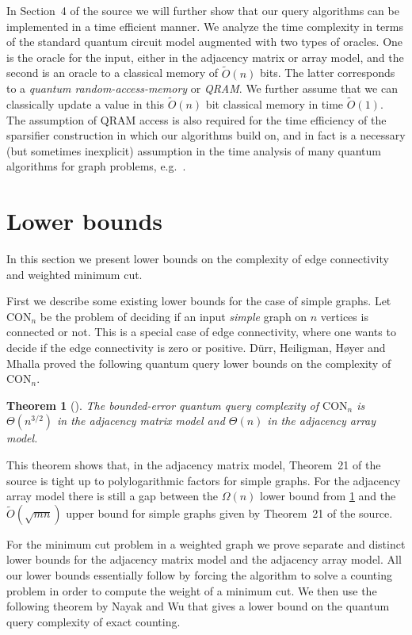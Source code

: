 \documentclass[10pt,a4paper]{article}
\newcommand{\CON}{\mathrm{CON}}
\newcommand{\tO}{\tilde O}
\newcommand{\1}{\mathbf{1}}
\newtheorem{theorem}{Theorem}
\theoremstyle{definition}
\begin{document}
In Section~4 of the source we will further show that our query algorithms can be implemented in a time efficient manner.  We analyze the time complexity in terms of the standard quantum circuit model augmented with two types of oracles.  
One is the oracle for the input, either in the adjacency matrix or array model, and the second is an oracle to a classical memory of $\tO(n)$ bits.  The latter corresponds to a \emph{quantum random-access-memory} or \emph{QRAM}.  We further assume that 
we can classically update a value in this $\tO(n)$ bit classical memory in time $\tO(1)$.  
The assumption of QRAM access is also required for the time efficiency of the sparsifier construction in \cite{AdW19} which our algorithms build on, and in fact is a necessary (but sometimes inexplicit) assumption in the time analysis of many quantum algorithms for graph problems, e.g.~\cite{DHHM06,Amb06,B13}.


\setcounter{section}{4}
\setcounter{theorem}{32}
\section{Lower bounds} \label{sec:lower-bounds}
In this section we present lower bounds on the complexity of edge connectivity and weighted minimum cut.

First we describe some existing lower bounds for the case of simple graphs.
Let $\CON_n$ be the problem of deciding if an input \emph{simple} graph on $n$ vertices is connected or not.  This is a special case of edge connectivity, where one wants 
to decide if the edge connectivity is zero or positive.  D\"{u}rr, Heiligman, H{\o}yer and Mhalla \cite{DHHM06} proved the following quantum query lower bounds on the complexity of $\CON_n$.
\begin{theorem}[\cite{DHHM06}]
\label{thm:durr_lower}
The bounded-error quantum query complexity of $\CON_n$ is $\Theta(n^{3/2})$ in the adjacency matrix model and 
$\Theta(n)$ in the adjacency array model.  
\end{theorem}
\noindent
This theorem shows that, in the adjacency matrix model, Theorem~21 of the source is tight up to polylogarithmic factors for simple graphs.  For the adjacency array model 
there is still a gap between the $\Omega(n)$ lower bound from \cref{thm:durr_lower} and the $\tilde O(\sqrt{mn})$ upper bound for simple graphs given by Theorem~21 of the source.

For the minimum cut problem in a weighted graph we prove separate and distinct lower bounds for the adjacency matrix model and the adjacency array model.
All our lower bounds essentially follow by forcing the algorithm to solve a counting problem in order to compute the weight of a minimum cut.
We then use the following theorem by Nayak and Wu that gives a lower bound on the quantum query complexity of exact counting.
\end{document}
